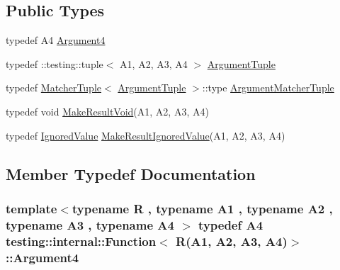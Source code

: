 \subsection*{Public Types}
\begin{DoxyCompactItemize}
\item 
typedef A4 \hyperlink{structtesting_1_1internal_1_1Function_3_01R_07A1_00_01A2_00_01A3_00_01A4_08_4_ae5039423598ab0fecd4f594acbf34d85}{Argument4}
\item 
typedef \+::testing\+::tuple$<$ A1, A2, A3, A4 $>$ \hyperlink{structtesting_1_1internal_1_1Function_3_01R_07A1_00_01A2_00_01A3_00_01A4_08_4_a8ad9e0ae57a766f80a9816ad45626812}{Argument\+Tuple}
\item 
typedef \hyperlink{structtesting_1_1internal_1_1MatcherTuple}{Matcher\+Tuple}$<$ \hyperlink{structtesting_1_1internal_1_1Function_3_01R_07_08_4_ad483c3128c470d8cdb55c3ac1c575c11}{Argument\+Tuple} $>$\+::type \hyperlink{structtesting_1_1internal_1_1Function_3_01R_07A1_00_01A2_00_01A3_00_01A4_08_4_a9524b18868ab632a90d4cb6917057a14}{Argument\+Matcher\+Tuple}
\item 
typedef void \hyperlink{structtesting_1_1internal_1_1Function_3_01R_07A1_00_01A2_00_01A3_00_01A4_08_4_af7462da27e87a9d580e7f9748ebc5754}{Make\+Result\+Void}(A1, A2, A3, A4)
\item 
typedef \hyperlink{classtesting_1_1internal_1_1IgnoredValue}{Ignored\+Value} \hyperlink{structtesting_1_1internal_1_1Function_3_01R_07A1_00_01A2_00_01A3_00_01A4_08_4_a6736086d1c8ba25788add1e5180207f9}{Make\+Result\+Ignored\+Value}(A1, A2, A3, A4)
\end{DoxyCompactItemize}


\subsection{Member Typedef Documentation}
\subsubsection[{\texorpdfstring{Argument4}{Argument4}}]{\setlength{\rightskip}{0pt plus 5cm}template$<$typename R , typename A1 , typename A2 , typename A3 , typename A4 $>$ typedef A4 {\bf testing\+::internal\+::\+Function}$<$ R(A1, A2, A3, A4)$>$\+::{\bf Argument4}}\hypertarget{structtesting_1_1internal_1_1Function_3_01R_07A1_00_01A2_00_01A3_00_01A4_08_4_ae5039423598ab0fecd4f594acbf34d85}{}\label{structtesting_1_1internal_1_1Function_3_01R_07A1_00_01A2_00_01A3_00_01A4_08_4_ae5039423598ab0fecd4f594acbf34d85}
